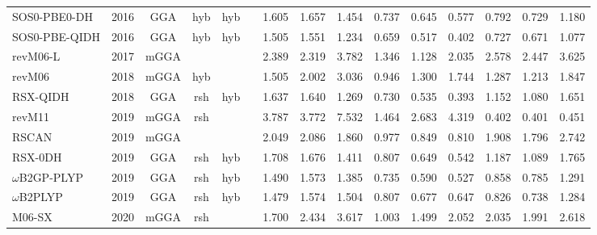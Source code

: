 \begin{landscape}
\begin{longtable}{lc:cccc:rrr:rrr:rrr}
    SOS0-PBE0-DH     & 2016 & GGA  & hyb      & hyb         &           & 1.605             & 1.657             & 1.454  & 0.737              & 0.645             & 0.577  & 0.792   & 0.729 & 1.180 \\
    SOS0-PBE-QIDH    & 2016 & GGA  & hyb      & hyb         &           & 1.505             & 1.551             & 1.234  & 0.659              & 0.517             & 0.402  & 0.727   & 0.671 & 1.077 \\
    revM06-L         & 2017 & mGGA &          &             &           & 2.389             & 2.319             & 3.782  & 1.346              & 1.128             & 2.035  & 2.578   & 2.447 & 3.625 \\
    revM06           & 2018 & mGGA & hyb      &             &           & 1.505             & 2.002             & 3.036  & 0.946              & 1.300             & 1.744  & 1.287   & 1.213 & 1.847 \\
    RSX-QIDH         & 2018 & GGA  & rsh      & hyb         &           & 1.637             & 1.640             & 1.269  & 0.730              & 0.535             & 0.393  & 1.152   & 1.080 & 1.651 \\
    revM11           & 2019 & mGGA & rsh      &             &           & 3.787             & 3.772             & 7.532  & 1.464              & 2.683             & 4.319  & 0.402   & 0.401 & 0.451 \\
    RSCAN            & 2019 & mGGA &          &             &           & 2.049             & 2.086             & 1.860  & 0.977              & 0.849             & 0.810  & 1.908   & 1.796 & 2.742 \\
    RSX-0DH          & 2019 & GGA  & rsh      & hyb         &           & 1.708             & 1.676             & 1.411  & 0.807              & 0.649             & 0.542  & 1.187   & 1.089 & 1.765 \\
    $\omega$B2GP-PLYP       & 2019 & GGA  & rsh      & hyb         &           & 1.490             & 1.573             & 1.385  & 0.735              & 0.590             & 0.527  & 0.858   & 0.785 & 1.291 \\
    $\omega$B2PLYP          & 2019 & GGA  & rsh      & hyb         &           & 1.479             & 1.574             & 1.504  & 0.807              & 0.677             & 0.647  & 0.826   & 0.738 & 1.284 \\
    M06-SX           & 2020 & mGGA & rsh      &             &           & 1.700             & 2.434             & 3.617  & 1.003              & 1.499             & 2.052  & 2.035   & 1.991 & 2.618 \\

\end{longtable}
\end{landscape}
